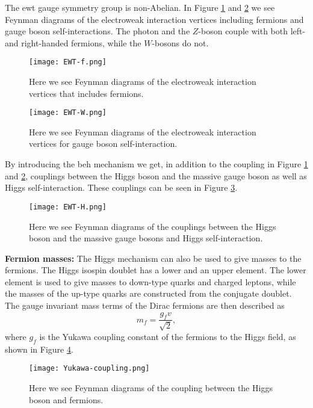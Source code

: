 \documentclass[a4paper, american, 12pt]{report}
\begin{document}
	The \acrshort{ewt} gauge symmetry group is non-Abelian. In Figure \ref{fig:EWT-f} and \ref{fig:EWT-W} we see Feynman diagrams of the electroweak interaction vertices including fermions and gauge boson self-interactions. The photon and the $Z$-boson couple with both left- and right-handed fermions, while the $W$-bosons do not.
	
	\begin{figure}[htbp!]
		\centering\texttt{[image: EWT-f.png]}
		\caption[EWT fermion vertex Feynman diagrams.]{Here we see Feynman diagrams of the electroweak interaction vertices that includes fermions. \label{fig:EWT-f}}
	\end{figure}
	\begin{figure}[htbp!]
		\centering\texttt{[image: EWT-W.png]}
		\caption[EWT gauge boson vertx Feynman diagram.]{Here we see Feynman diagrams of the electroweak interaction vertices for gauge boson self-interaction. \label{fig:EWT-W}}
	\end{figure}

	
	By introducing the \acrshort{beh} mechanism we get, in addition to the coupling in Figure \ref{fig:EWT-f} and \ref{fig:EWT-W}, couplings between the Higgs boson and the massive gauge boson as well as Higgs self-interaction. These couplings can be seen in Figure \ref{fig:EWT-H}.
	\begin{figure}[htbp!]
		\hspace*{-0.5cm}
		\centering\texttt{[image: EWT-H.png]}
		\caption[Higgs-bosons coupling Feynman diagrams.]{Here we see Feynman diagrams of the couplings between the Higgs boson and the massive gauge bosons and Higgs self-interaction. \label{fig:EWT-H}}
	\end{figure}

	\textbf{Fermion masses:}
	The Higgs mechanism can also be used to give masses to the fermions. The Higgs isospin doublet has a lower and an upper element. The lower element is used to give masses to down-type quarks and charged leptons, while the masses of the up-type quarks are constructed from the conjugate doublet. The gauge invariant mass terms of the Dirac fermions are then described as 
	\begin{equation}
	\label{eq:Dirac_fermion_masses}
		m_f=\frac{g_fv}{\sqrt{2}},
	\end{equation}
	where $g_f$ is the Yukawa coupling constant of the fermions to the Higgs field, as shown in Figure \ref{fig:Yukawa}. 
	
	\begin{figure}[htbp!]
		\centering\texttt{[image: Yukawa-coupling.png]}
		\caption[Higgs-fermions coupling diagram.]{Here we see Feynman diagrams of the coupling between the Higgs boson and fermions. \label{fig:Yukawa}}
	\end{figure}
	
\end{document}
